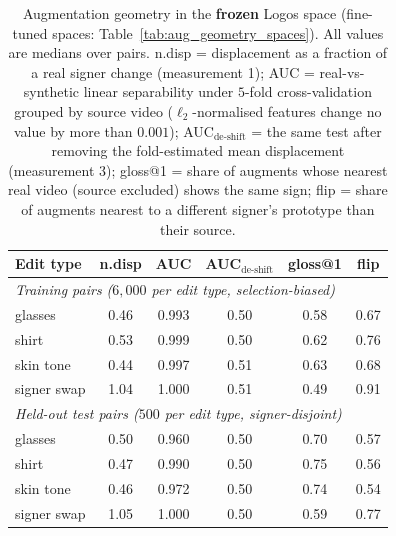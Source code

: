 \begin{table}[t]
\centering
\footnotesize
\setlength{\tabcolsep}{4pt}
\begin{tabular}{lccccc}
\toprule
\textbf{Edit type} & \textbf{n.disp} & \textbf{AUC} &
\textbf{AUC$_{\text{de-shift}}$} & \textbf{gloss@1} & \textbf{flip} \\
\midrule
\multicolumn{6}{l}{\emph{Training pairs ($6{,}000$ per edit type, selection-biased)}} \\
\;\;glasses     & 0.46 & 0.993 & 0.50 & 0.58 & 0.67 \\
\;\;shirt       & 0.53 & 0.999 & 0.50 & 0.62 & 0.76 \\
\;\;skin tone   & 0.44 & 0.997 & 0.51 & 0.63 & 0.68 \\
\;\;signer swap & 1.04 & 1.000 & 0.51 & 0.49 & 0.91 \\
\midrule
\multicolumn{6}{l}{\emph{Held-out test pairs ($500$ per edit type, signer-disjoint)}} \\
\;\;glasses     & 0.50 & 0.960 & 0.50 & 0.70 & 0.57 \\
\;\;shirt       & 0.47 & 0.990 & 0.50 & 0.75 & 0.56 \\
\;\;skin tone   & 0.46 & 0.972 & 0.50 & 0.74 & 0.54 \\
\;\;signer swap & 1.05 & 1.000 & 0.50 & 0.59 & 0.77 \\
\bottomrule
\end{tabular}
\caption[Augmentation geometry in the frozen Logos space]{Augmentation geometry in the \textbf{frozen} Logos space
(fine-tuned spaces: Table~\ref{tab:aug_geometry_spaces}). All values are
medians over pairs. n.disp = displacement as a fraction of a real signer
change (measurement 1); AUC = real-vs-synthetic linear separability under
$5$-fold cross-validation grouped by source video ($\ell_2$-normalised
features change no value by more than $0.001$); AUC$_{\text{de-shift}}$ =
the same test after removing the fold-estimated mean displacement
(measurement 3); gloss@1 = share of augments whose nearest real video
(source excluded) shows the same sign; flip = share of augments nearest to
a different signer's prototype than their source.}
\label{tab:aug_geometry_frozen}
\end{table}

